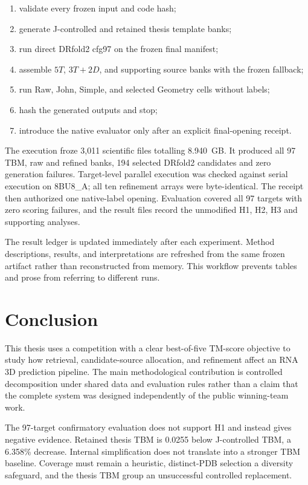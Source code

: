 \documentclass[12pt,a4paper,oneside]{report}
\begin{document}
\begin{enumerate}
  \item validate every frozen input and code hash;
  \item generate J-controlled and retained thesis template banks;
  \item run direct DRfold2 cfg97 on the frozen final manifest;
  \item assemble $5T$, $3T+2D$, and supporting source banks with the frozen fallback;
  \item run Raw, John, Simple, and selected Geometry cells without labels;
  \item hash the generated outputs and stop;
  \item introduce the native evaluator only after an explicit final-opening receipt.
\end{enumerate}

The execution froze 3,011 scientific files totalling 8.940~GB. It produced all 97
TBM, raw and refined banks, 194 selected DRfold2 candidates and zero generation
failures. Target-level parallel execution was checked against serial execution on
8BU8\_A; all ten refinement arrays were byte-identical. The receipt then authorized
one native-label opening. Evaluation covered all 97 targets with zero scoring failures,
and the result files record the unmodified H1, H2, H3 and supporting analyses.

The result ledger is updated immediately after each experiment. Method descriptions,
results, and interpretations are refreshed from the same frozen artifact rather than
reconstructed from memory. This workflow prevents tables and prose from referring to
different runs.

\chapter{Conclusion}

This thesis uses a competition with a clear best-of-five TM-score objective to study
how retrieval, candidate-source allocation, and refinement affect an RNA 3D prediction
pipeline. The main methodological contribution is controlled decomposition under
shared data and evaluation rules rather than a claim that the complete system was
designed independently of the public winning-team work.

The 97-target confirmatory evaluation does not support H1 and instead gives negative
evidence. Retained thesis TBM is 0.0255 below J-controlled TBM, a 6.358\% decrease.
Internal simplification does not translate into a stronger TBM baseline. Coverage must
remain a heuristic, distinct-PDB selection a diversity safeguard, and the thesis TBM
group an unsuccessful controlled replacement.
\end{document}
